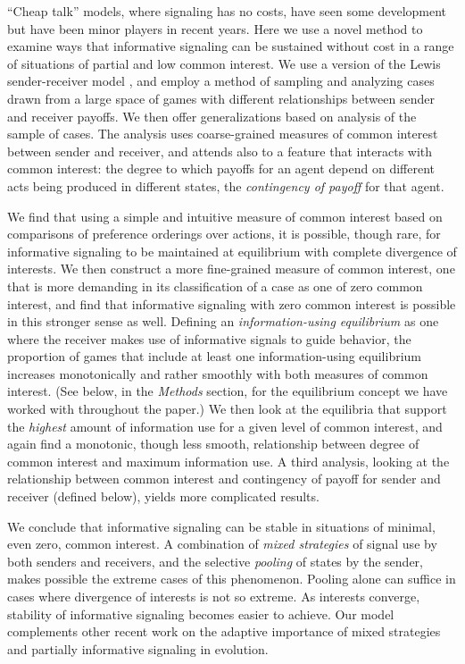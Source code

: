 \documentclass[10pt]{article}
\begin{document}
``Cheap talk'' models, where signaling has no costs, have seen some
development
\cite{Crawford1982, Farrell1996, Bergstrom1998, Silk2000, Bradbury2000, Wagner2012}
but have been minor players in recent years. Here we use a novel method
to examine ways that informative signaling can be sustained without cost
in a range of situations of partial and low common interest. We use a
version of the Lewis sender-receiver model
\cite{Lewis1969, Skyrms2010}, and employ a method of sampling and
analyzing cases drawn from a large space of games with different
relationships between sender and receiver payoffs. We then offer
generalizations based on analysis of the sample of cases. The analysis
uses coarse-grained measures of common interest between sender and
receiver, and attends also to a feature that interacts with common
interest: the degree to which payoffs for an agent depend on different
acts being produced in different states, the \emph{contingency of
payoff} for that agent.

We find that using a simple and intuitive measure of common interest
based on comparisons of preference orderings over actions, it is
possible, though rare, for informative signaling to be maintained at
equilibrium with complete divergence of interests. We then construct a
more fine-grained measure of common interest, one that is more demanding
in its classification of a case as one of zero common interest, and find
that informative signaling with zero common interest is possible in this
stronger sense as well. Defining an \emph{information-using equilibrium}
as one where the receiver makes use of informative signals to guide
behavior, the proportion of games that include at least one
information-using equilibrium increases monotonically and rather
smoothly with both measures of common interest. (See below, in the \emph{Methods} section, for the equilibrium concept we have worked with throughout the paper.) We then look at the
equilibria that support the \emph{highest} amount of information use for
a given level of common interest, and again find a monotonic, though
less smooth, relationship between degree of common interest and maximum
information use. A third analysis, looking at the relationship between
common interest and contingency of payoff for sender and receiver
(defined below), yields more complicated results.

We conclude that informative signaling can be stable in situations of
minimal, even zero, common interest. A combination of \emph{mixed
strategies} of signal use by both senders and receivers, and the
selective \emph{pooling} of states by the sender, makes possible the
extreme cases of this phenomenon. Pooling alone can suffice in cases
where divergence of interests is not so extreme. As interests converge,
stability of informative signaling becomes easier to achieve. Our model
complements other recent work on the adaptive importance of mixed
strategies and partially informative signaling in evolution.
\end{document}
